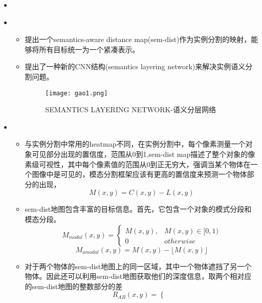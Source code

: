   \begin{itemize}[leftmargin=*]
  	\item
  	{
  	}
    \item
      {\small
      \begin{itemize}
        \item 提出一个semantics-aware distance map(sem-dist)作为实例分割的映射，能够将所有目标统一为一个紧凑表示。
        \item 提出了一种新的CNN结构(semantics layering network)来解决实例语义分割问题。
        \begin{figure}
         	\centering
         	\texttt{[image: gao1.png]}
         	\caption{SEMANTICS LAYERING NETWORK-语义分层网络\label{sa}}
         \end{figure}
      \end{itemize}
      }
    \item
      {\small
      \begin{itemize}
        \item 与实例分割中常用的heatmap不同，在实例分割中，每个像素测量一个对象可见部分出现的置信度，范围从0到1,sem-dist map描述了整个对象的像素级可视性，其中每个像素值的范围从0到正无穷大，强调当某个物体在一个图像中是可见的，模态分割框架应该有更高的置信度来预测一个物体部分的出现，
		\begin{equation}M(x, y)=C(x, y)-L(x, y)\end{equation}
		\item sem-dist地图包含丰富的目标信息。首先，它包含一个对象的模式分段和模态分段。
		\begin{equation}M_{ {modal}}(x, y)=\left\{\begin{array}{ll}
		M(x, y), & M(x, y) \in[0,1) \\
		0  &  { otherwise }
		\end{array}\right.\end{equation}
		\begin{equation}M_{a m o d a l}(x, y)=M(x, y)-\lfloor M(x, y)\rfloor\end{equation}
		\item 对于两个物体的sem-dist地图上的同一区域，其中一个物体遮挡了另一个物体。因此还可以利用sem-dist地图获取他们的深度信息，取两个相对应的sem-dist地图的整数部分的差
		\begin{equation}R_{A B}(x, y)=\left\{\begin{array}{ll}

\end{array}
\end{equation}
\end{itemize}}
\end{itemize}
